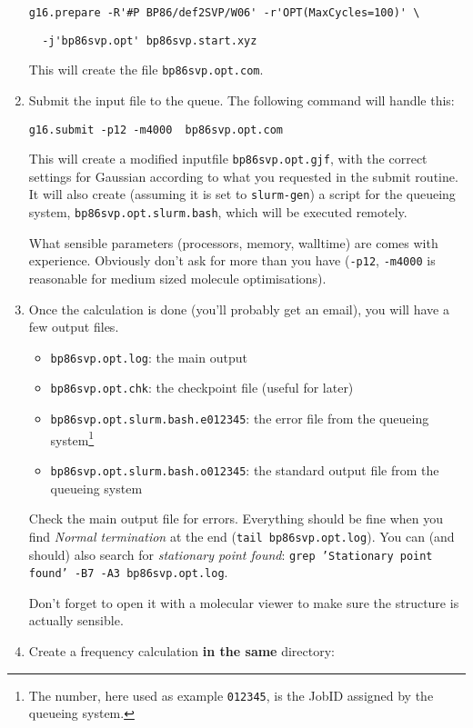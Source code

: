 \documentclass[   %
  final,          %
  a4paper         %
]{article}
\begin{document}
\begin{enumerate}
  \lstinline`g16.prepare -R'#P BP86/def2SVP/W06' -r'OPT(MaxCycles=100)' \`\par
  \lstinline`  -j'bp86svp.opt' bp86svp.start.xyz`

  This will create the file \texttt{bp86svp.opt.com}.

\item
  Submit the input file to the queue. 
  The following command will handle this:

  \lstinline`g16.submit -p12 -m4000  bp86svp.opt.com`

  This will create a modified inputfile \texttt{bp86svp.opt.gjf}, with
  the correct settings for Gaussian according to what you requested in
  the submit routine. It will also create (assuming it is set to
  \texttt{slurm-gen}) a script for the queueing system,
  \texttt{bp86svp.opt.slurm.bash}, which will be executed remotely.

  What sensible parameters (processors, memory, walltime) are comes 
  with experience. Obviously don't ask for more than you have 
  (\lstinline`-p12`, \lstinline`-m4000` is reasonable for medium sized molecule optimisations).
\item
  Once the calculation is done (you'll probably get an email), you will
  have a few output files.

  \begin{itemize}
  \item
    \texttt{bp86svp.opt.log}: the main output
  \item
    \texttt{bp86svp.opt.chk}: the checkpoint file (useful for later)
  \item
    \texttt{bp86svp.opt.slurm.bash.e012345}: the
    error file from the queueing system\footnote{%
      The number, here used as example \texttt{012345}, is the JobID
      assigned by the queueing system.}
  \item
    \texttt{bp86svp.opt.slurm.bash.o012345}: the
    standard output file from the queueing system
  \end{itemize}

  Check the main output file for errors. Everything should be fine when
  you find \emph{Normal termination} at the end (\texttt{tail bp86svp.opt.log}).
  You can (and should) also search for \emph{stationary point found}:
  \texttt{grep 'Stationary point found' -B7 -A3  bp86svp.opt.log}.

  Don't forget to open it with a molecular viewer to make sure the
  structure is actually sensible.
\item
  Create a frequency calculation \textbf{in the same} directory:


\end{enumerate}
\end{document}
